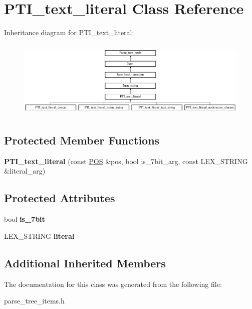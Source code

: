 \hypertarget{classPTI__text__literal}{}\section{P\+T\+I\+\_\+text\+\_\+literal Class Reference}
\label{classPTI__text__literal}
Inheritance diagram for P\+T\+I\+\_\+text\+\_\+literal\+:\begin{figure}[H]
\begin{center}
\leavevmode
\includegraphics[height=3.766816cm]{classPTI__text__literal}
\end{center}
\end{figure}
\subsection*{Protected Member Functions}
\begin{DoxyCompactItemize}
\item 
\mbox{\label{classPTI__text__literal_a08aa562095fe9cc56b112b2aaab5c7d3}} 
{\bfseries P\+T\+I\+\_\+text\+\_\+literal} (const \mbox{\hyperlink{structYYLTYPE}{P\+OS}} \&pos, bool is\+\_\+7bit\+\_\+arg, const L\+E\+X\+\_\+\+S\+T\+R\+I\+NG \&literal\+\_\+arg)
\end{DoxyCompactItemize}
\subsection*{Protected Attributes}
\begin{DoxyCompactItemize}
\item 
\mbox{\label{classPTI__text__literal_a2fae4181b03f0c81efc8f80491d3f496}} 
bool {\bfseries is\+\_\+7bit}
\item 
\mbox{\label{classPTI__text__literal_aed78479b773a7f40337dace085511ef5}} 
L\+E\+X\+\_\+\+S\+T\+R\+I\+NG {\bfseries literal}
\end{DoxyCompactItemize}
\subsection*{Additional Inherited Members}


The documentation for this class was generated from the following file\+:\begin{DoxyCompactItemize}
\item 
parse\+\_\+tree\+\_\+items.\+h\end{DoxyCompactItemize}
